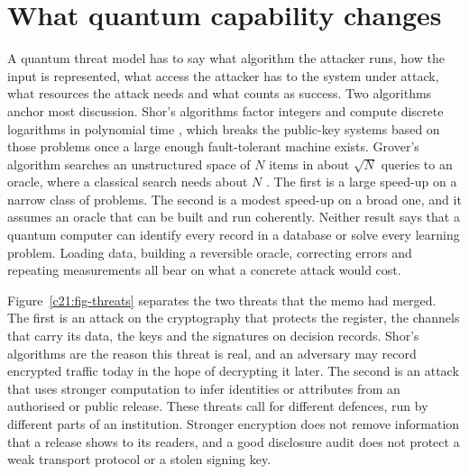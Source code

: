 \section{What quantum capability changes}

A quantum threat model has to say what algorithm the attacker runs, how the input is represented,
what access the attacker has to the system under attack, what resources the attack needs and what
counts as success. Two algorithms anchor most discussion. Shor's algorithms factor integers and
compute discrete logarithms in polynomial time \citep{shor1997}, which breaks the public-key systems
based on those problems once a large enough fault-tolerant machine exists. Grover's algorithm
searches an unstructured space of $N$ items in about $\sqrt N$ queries to an oracle, where a classical
search needs about $N$ \citep{grover1996}. The first is a large speed-up on a narrow class of
problems. The second is a modest speed-up on a broad one, and it assumes an oracle that can be built
and run coherently. Neither result says that a quantum computer can identify every record in a
database or solve every learning problem. Loading data, building a reversible oracle, correcting
errors and repeating measurements all bear on what a concrete attack would cost.

Figure~\ref{c21:fig-threats} separates the two threats that the memo had merged. The first is an attack on the
cryptography that protects the register, the channels that carry its data, the keys and the
signatures on decision records. Shor's algorithms are the reason this threat is real, and an
adversary may record encrypted traffic today in the hope of decrypting it later. The second is an
attack that uses stronger computation to infer identities or attributes from an authorised or
public release. These threats call for different defences, run by different parts of an
institution. Stronger encryption does not remove information that a release shows to its readers,
and a good disclosure audit does not protect a weak transport protocol or a stolen signing key.

